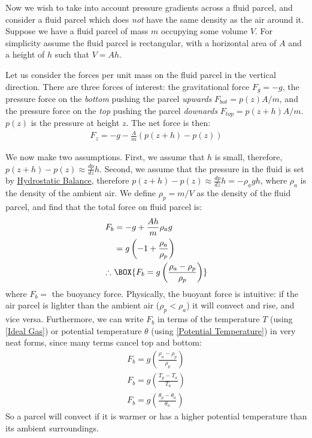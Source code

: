 Now we wish to take into account pressure gradients across a fluid parcel, and consider a fluid parcel which does \textit{not} have the same density as the air around it. Suppose we have a fluid parcel of mass $m$ occupying some volume $V$. For simplicity assume the fluid parcel is rectangular, with a horizontal area of $A$ and a height of $h$ such that $V=Ah$.

Let us consider the forces per unit mass on the fluid parcel in the vertical direction. There are three forces of interest: the gravitational force $F_g=-g$, the pressure force on the \textit{bottom} pushing the parcel \textit{upwards} $F_{bot}=p(z)A/m$, and the pressure force on the \textit{top} pushing the parcel \textit{downards} $F_{top}=p(z+h)A/m$. $p(z)$ is the pressure at height $z$. The net force is then:
\begin{align*}
    F_z=-g-\frac{A}{m}(p(z+h)-p(z))
\end{align*}

We now make two assumptions. First, we assume that $h$ is small, therefore, $p(z+h)-p(z)\approx \frac{dp}{dz} h$. Second, we assume that the pressure in the fluid is set by \hyperref[Hydrostatic Balance]{Hydrostatic Balance}, therefore $p(z+h)-p(z)\approx \frac{dp}{dz} h=-\rho_a g h$, where $\rho_a$ is the density of the ambient air. We define $\rho_p=m/V$ as the density of the fluid parcel, and find that the total force on fluid parcel  is:
\begin{align}
    F_b&=-g+\frac{Ah}{m}\rho_a g\nonumber\\
    &=g\left( -1+ \frac{\rho_a}{\rho_p}\right)\nonumber\\
    \label{Buoyancy Force}
    \therefore \,\,& \BOX{F_b=g\left( \frac{\rho_a-\rho_p}{\rho_p} \right)}
\end{align}
where $F_b=$ the buoyancy force. Physically, the buoyant force is intuitive: if the air parcel is lighter than the ambient air ($\rho_p<\rho_a$) it will convect and rise, and vice versa. Furthermore, we can write $F_b$ in terms of the temperature $T$ (using \ref{Ideal Gas}) or potential temperature $\theta$ (using \ref{Potential Temperature}) in very neat forms, since many terms cancel top and bottom:
\begin{align}
    F_b=g\left( \frac{\rho_a-\rho_p}{\rho_p} \right)\nonumber\\
    \label{Buoyancy Force Temp}
    \boxed{F_b=g\left( \frac{T_p-T_a}{T_a} \right)}\\
    \boxed{F_b=g\left( \frac{\theta_p-\theta_a}{\theta_a} \right)}
\end{align}
So a parcel will convect if it is warmer or has a higher potential temperature than its ambient surroundings.

